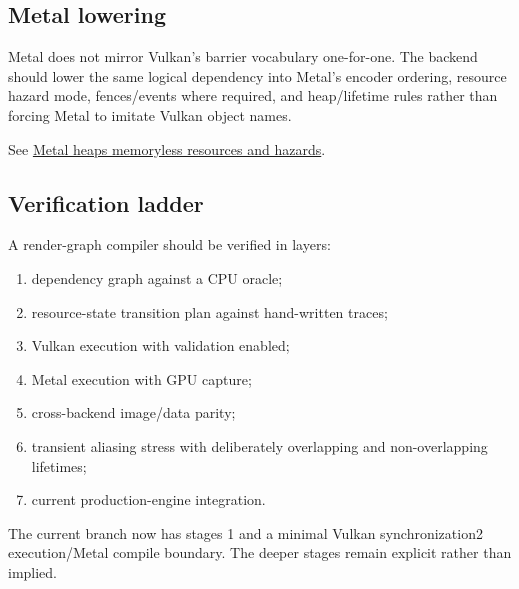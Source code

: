 \subsection{Metal lowering}\label{appendix-0fc95374cb7e-metal-lowering}

\hypertarget{appendix-0fc95374cb7e-metal-lowering}{}

Metal does not mirror Vulkan's barrier vocabulary one-for-one. The backend should lower the same logical dependency into Metal's encoder ordering, resource hazard mode, fences/events where required, and heap/lifetime rules rather than forcing Metal to imitate Vulkan object names.

See \hyperref[appendix-563b2cb23fc3]{Metal heaps memoryless resources and hazards}.

\subsection{Verification ladder}\label{appendix-0fc95374cb7e-verification-ladder}

\hypertarget{appendix-0fc95374cb7e-verification-ladder}{}

A render-graph compiler should be verified in layers:

\begin{enumerate}
\def\labelenumi{\arabic{enumi}.}
\tightlist
\item
  dependency graph against a CPU oracle;
\item
  resource-state transition plan against hand-written traces;
\item
  Vulkan execution with validation enabled;
\item
  Metal execution with GPU capture;
\item
  cross-backend image/data parity;
\item
  transient aliasing stress with deliberately overlapping and non-overlapping lifetimes;
\item
  current production-engine integration.
\end{enumerate}

The current branch now has stages 1 and a minimal Vulkan synchronization2 execution/Metal compile boundary. The deeper stages remain explicit rather than implied.
